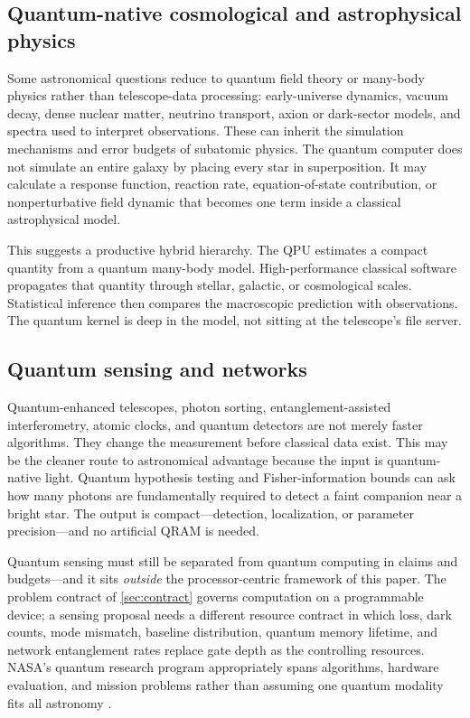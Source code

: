 \subsection{Quantum-native cosmological and astrophysical physics}

Some astronomical questions reduce to quantum field theory or many-body physics rather than telescope-data processing: early-universe dynamics, vacuum decay, dense nuclear matter, neutrino transport, axion or dark-sector models, and spectra used to interpret observations. These can inherit the simulation mechanisms and error budgets of subatomic physics. The quantum computer does not simulate an entire galaxy by placing every star in superposition. It may calculate a response function, reaction rate, equation-of-state contribution, or nonperturbative field dynamic that becomes one term inside a classical astrophysical model.

This suggests a productive hybrid hierarchy. The QPU estimates a compact quantity from a quantum many-body model. High-performance classical software propagates that quantity through stellar, galactic, or cosmological scales. Statistical inference then compares the macroscopic prediction with observations. The quantum kernel is deep in the model, not sitting at the telescope's file server.

\subsection{Quantum sensing and networks}

Quantum-enhanced telescopes, photon sorting, entanglement-assisted interferometry, atomic clocks, and quantum detectors are not merely faster algorithms. They change the measurement before classical data exist. This may be the cleaner route to astronomical advantage because the input is quantum-native light. Quantum hypothesis testing and Fisher-information bounds can ask how many photons are fundamentally required to detect a faint companion near a bright star. The output is compact---detection, localization, or parameter precision---and no artificial QRAM is needed.

Quantum sensing must still be separated from quantum computing in claims and budgets---and it sits \emph{outside} the processor-centric framework of this paper. The problem contract of \cref{sec:contract} governs computation on a programmable device; a sensing proposal needs a different resource contract in which loss, dark counts, mode mismatch, baseline distribution, quantum memory lifetime, and network entanglement rates replace gate depth as the controlling resources. NASA's quantum research program appropriately spans algorithms, hardware evaluation, and mission problems rather than assuming one quantum modality fits all astronomy \citep{nasaquail2026}.

